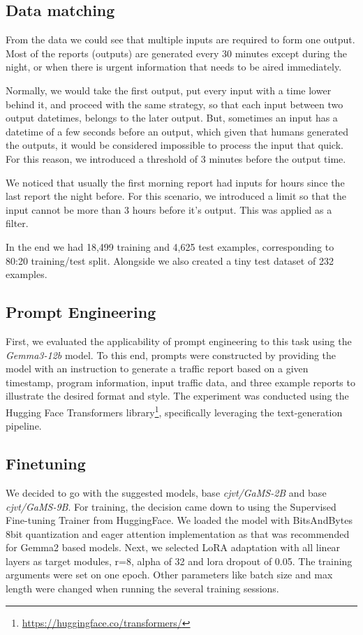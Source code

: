 \documentclass[fleqn,moreauthors,10pt]{ds_report}
\begin{document}
\subsection*{Data matching}
From the data we could see that multiple inputs are required to form one output. Most of the reports (outputs) are generated every 30 minutes except during the night, or when there is urgent information that needs to be aired immediately.

Normally, we would take the first output, put every input with a time lower behind it, and proceed with the same strategy, so that each input between two output datetimes, belongs to the later output. But, sometimes an input has a datetime of a few seconds before an output, which given that humans generated the outputs, it would be considered impossible to process the input that quick. For this reason, we introduced a threshold of 3 minutes before the output time.

We noticed that usually the first morning report had inputs for hours since the last report the night before. For this scenario, we introduced a limit so that the input cannot be more than 3 hours before it’s output. This was applied as a filter.

In the end we had 18,499 training and 4,625 test examples, corresponding to 80:20 training/test split. Alongside we also created a tiny test dataset of 232 examples.


\subsection*{Prompt Engineering}
First, we evaluated the applicability of prompt engineering to this task using the \textit{Gemma3-12b} model.
To this end, prompts were constructed by providing the model with an instruction to generate a traffic report based on a given timestamp, program information, input traffic data, and three example reports to illustrate the desired format and style.
The experiment was conducted using the Hugging Face Transformers library\footnote{\url{https://huggingface.co/transformers/}}, specifically leveraging the text-generation pipeline.


\subsection*{Finetuning}
We decided to go with the suggested models, base \textit{cjvt/GaMS-2B} and base \textit{cjvt/GaMS-9B}.
For training, the decision came down to using the Supervised Fine-tuning Trainer from HuggingFace. We loaded the model with BitsAndBytes 8bit quantization and eager attention implementation as that was recommended for Gemma2 based models. 
Next, we selected LoRA adaptation with all linear layers as target modules, r=8, alpha of 32 and lora dropout of 0.05. The training arguments were set on one epoch. Other parameters like batch size and max length were changed when running the several training sessions.
\end{document}
